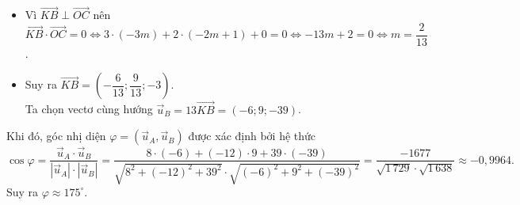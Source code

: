 \begin{ex}
{\begin{itemchoice}
\begin{itemize}
				\item Vì $\overrightarrow{KB} \perp \overrightarrow{OC}$ nên $\overrightarrow{KB} \cdot \overrightarrow{OC} = 0 \Leftrightarrow 3\cdot (-3m) + 2\cdot (-2m +1) + 0 = 0 \Leftrightarrow -13m +2 = 0 \Leftrightarrow m = \dfrac{2}{13}$.
				\item Suy ra $\overrightarrow{KB}= \left(-\dfrac{6}{13}; \dfrac{9}{13}; -3\right)$. \\
				Ta chọn vectơ cùng hướng $\overrightarrow{u}_B = 13\overrightarrow{KB} = (-6; 9; -39)$.
			\end{itemize}
			Khi đó, góc nhị diện $\varphi=\left(\overrightarrow{u}_A, \overrightarrow{u}_B\right)$ được xác định bởi hệ thức
			\[\cos\varphi= \dfrac{\overrightarrow{u}_A \cdot \overrightarrow{u}_B}{\left|\overrightarrow{u}_A\right|\cdot \left|\overrightarrow{u}_B\right|} = \dfrac{8 \cdot (-6) + (-12) \cdot 9 + 39 \cdot (-39)}{\sqrt{8^2 + (-12)^2 + 39^2} \cdot \sqrt{(-6)^2 + 9^2 + (-39)^2}} = \dfrac{-1677}{\sqrt{1\,729} \cdot \sqrt{1\,638}} \approx -0{,}9964.\]
			Suy ra $\varphi\approx 175^\circ$.
		\end{itemchoice}
	}
\end{ex}

